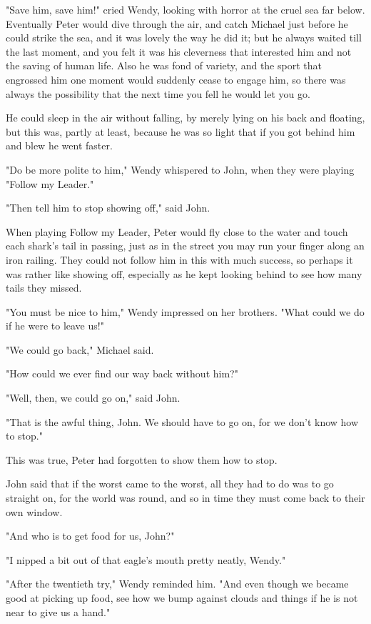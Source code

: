 "Save him, save him!\@" cried Wendy, looking with horror at the cruel sea far below.
Eventually Peter would dive through the air, and catch Michael just before he could strike the sea, and it was lovely the way he did it;
but he always waited till the last moment, and you felt it was his cleverness that interested him and not the saving of human life.
Also he was fond of variety, and the sport that engrossed him one moment would suddenly cease to engage him, so there was always the possibility that the next time you fell he would let you go.

He could sleep in the air without falling, by merely lying on his back and floating, but this was, partly at least, because he was so light that if you got behind him and blew he went faster.

"Do be more polite to him," Wendy whispered to John, when they were playing "Follow my Leader."

"Then tell him to stop showing off," said John.

When playing Follow my Leader, Peter would fly close to the water and touch each shark's tail in passing, just as in the street you may run your finger along an iron railing.
They could not follow him in this with much success, so perhaps it was rather like showing off, especially as he kept looking behind to see how many tails they missed.

"You must be nice to him," Wendy impressed on her brothers.
"What could we do if he were to leave us!"

"We could go back," Michael said.

"How could we ever find our way back without him?"

"Well, then, we could go on," said John.

"That is the awful thing, John.
We should have to go on, for we don't know how to stop."

This was true, Peter had forgotten to show them how to stop.

John said that if the worst came to the worst, all they had to do was to go straight on, for the world was round, and so in time they must come back to their own window.

"And who is to get food for us, John?"

"I nipped a bit out of that eagle's mouth pretty neatly, Wendy."

"After the twentieth try," Wendy reminded him.
"And even though we became good at picking up food, see how we bump against clouds and things if he is not near to give us a hand."

